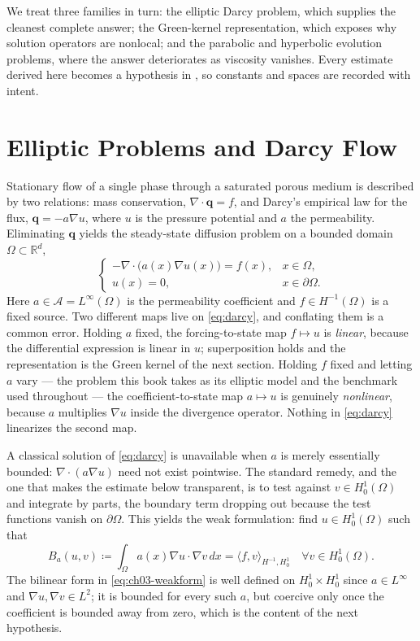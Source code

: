 We treat three families in turn: the elliptic Darcy problem, which supplies the
cleanest complete answer; the Green-kernel representation, which exposes why
solution operators are nonlocal; and the parabolic and hyperbolic evolution
problems, where the answer deteriorates as viscosity vanishes. Every estimate
derived here becomes a hypothesis in ,
so constants and spaces are recorded with intent.

\section{Elliptic Problems and Darcy Flow}
Stationary flow of a single phase through a saturated porous
medium is described by two relations: mass conservation, $\nabla \cdot \mathbf{q} = f$,
and Darcy's empirical law for the flux, $\mathbf{q} = -a \nabla u$, where $u$ is
the pressure potential and $a$ the permeability. Eliminating $\mathbf{q}$ yields
the steady-state diffusion problem on a bounded domain
$\Omega \subset \mathbb{R}^d$,
\begin{equation}
  \label{eq:darcy}
  \begin{cases}
    -\nabla \cdot \big( a(x) \nabla u(x) \big) = f(x), & x \in \Omega, \\
    u(x) = 0, & x \in \partial\Omega.
  \end{cases}
\end{equation}
Here $a \in \mathcal{A} = L^\infty(\Omega)$ is the permeability coefficient and
$f \in H^{-1}(\Omega)$ is a fixed source. Two different maps live on
\eqref{eq:darcy}, and conflating them is a common error. Holding $a$ fixed, the
forcing-to-state map $f \mapsto u$ is \emph{linear}, because the differential
expression is linear in $u$; superposition holds and the representation is the
Green kernel of the next section. Holding $f$ fixed and letting $a$ vary --- the
problem this book takes as its elliptic model and the benchmark used throughout
 --- the coefficient-to-state map $a \mapsto u$ is genuinely
\emph{nonlinear}, because $a$ multiplies $\nabla u$ inside the divergence
operator. Nothing in \eqref{eq:darcy} linearizes the second map.

A classical solution of \eqref{eq:darcy} is unavailable when $a$ is merely
essentially bounded: $\nabla \cdot (a \nabla u)$ need not exist pointwise. The
standard remedy, and the one that makes the estimate below transparent, is to
test against $v \in H^1_0(\Omega)$ and integrate by parts, the boundary term
dropping out because the test functions vanish on $\partial\Omega$. This yields
the weak formulation: find $u \in H^1_0(\Omega)$ such that
\begin{equation}
  \label{eq:ch03-weakform}
  B_a(u, v) \coloneqq \int_\Omega a(x) \nabla u \cdot \nabla v \, dx = \langle f, v \rangle_{H^{-1}, H^1_0} \quad \forall v \in H^1_0(\Omega).
\end{equation}
The bilinear form in \eqref{eq:ch03-weakform} is well defined on
$H^1_0 \times H^1_0$ since $a \in L^\infty$ and $\nabla u, \nabla v \in L^2$;
it is bounded for every such $a$, but coercive only once the coefficient is
bounded away from zero, which is the content of the next hypothesis.

